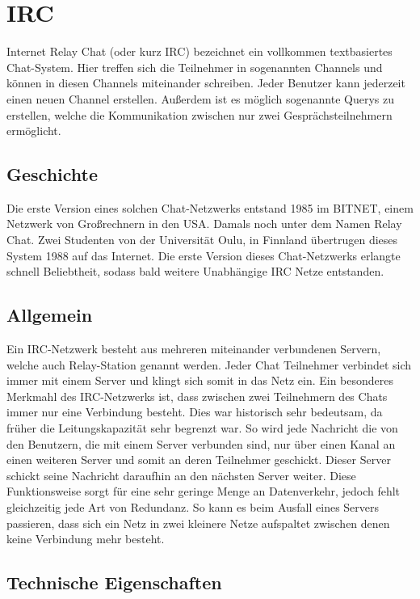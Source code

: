 \section{IRC}
Internet Relay Chat (oder kurz IRC) bezeichnet ein vollkommen textbasiertes Chat-System. Hier treffen sich die Teilnehmer in sogenannten Channels und können in diesen Channels miteinander schreiben. Jeder Benutzer kann jederzeit einen neuen Channel erstellen. Außerdem ist es möglich sogenannte Querys zu erstellen, welche die Kommunikation zwischen nur zwei Gesprächsteilnehmern ermöglicht.

\subsection{Geschichte}

Die erste Version eines solchen Chat-Netzwerks entstand 1985 im BITNET, einem Netzwerk von Großrechnern in den USA. Damals noch unter dem Namen Relay Chat. Zwei Studenten von der Universität Oulu, in Finnland übertrugen dieses System 1988 auf das Internet. Die erste Version dieses Chat-Netzwerks erlangte schnell Beliebtheit, sodass bald weitere Unabhängige IRC Netze entstanden.

\subsection{Allgemein}

Ein IRC-Netzwerk besteht aus mehreren miteinander verbundenen Servern, welche auch Relay-Station genannt werden. Jeder Chat Teilnehmer verbindet sich immer mit einem Server und klingt sich somit in das Netz ein. Ein besonderes Merkmahl des IRC-Netzwerks ist, dass zwischen zwei Teilnehmern des Chats immer nur eine Verbindung besteht. Dies war historisch sehr bedeutsam, da früher die Leitungskapazität sehr begrenzt war. So wird jede Nachricht die von den Benutzern, die mit einem Server verbunden sind, nur über einen Kanal an einen weiteren Server und somit an deren Teilnehmer geschickt. Dieser Server schickt seine Nachricht daraufhin an den nächsten Server weiter. Diese Funktionsweise sorgt für eine sehr geringe Menge an Datenverkehr, jedoch fehlt gleichzeitig jede Art von Redundanz. So kann es beim Ausfall eines Servers passieren, dass sich ein Netz in zwei kleinere Netze aufspaltet zwischen denen keine Verbindung mehr besteht.

\subsection{Technische Eigenschaften}

